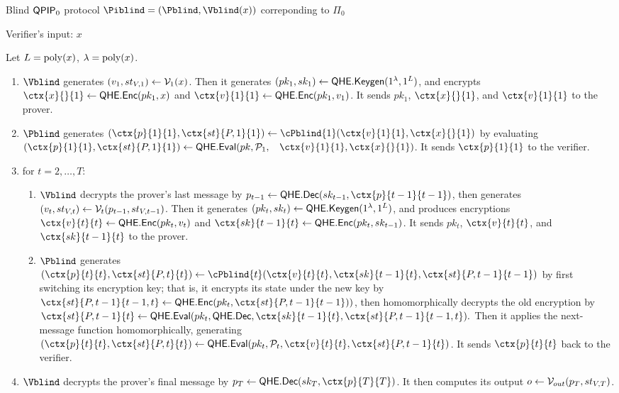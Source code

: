 \begin{protocol}{Blind $\operatorname{\mathsf{QPIP}}_0$ protocol $\Piblind=(\Pblind, \Vblind(x))$ correponding to $\Pi_0$}

	Verifier's input: $x$

	Let $L=\operatorname*{\operatorname{poly}}(x)$, $\lambda=\operatorname*{\operatorname{poly}}(x)$.

	\begin{enumerate}
		\item $\Vblind$ generates $(v_1, st_{V, 1})\leftarrow\mathcal{V}_1(x)$.
			Then it generates $(pk_1, sk_1)\leftarrow\mathsf{QHE.Keygen}(1^\lambda, 1^L)$,
			and encrypts $\ctx{x}{}{1}\leftarrow\QEnc(pk_1, x)$ and $\ctx{v}{1}{1}\leftarrow\QEnc(pk_1, v_1)$.
			It sends $pk_1$, $\ctx{x}{}{1}$, and $\ctx{v}{1}{1}$ to the prover.
		\item $\Pblind$ generates $(\ctx{p}{1}{1}, \ctx{st}{P, 1}{1})\leftarrow\cPblind{1}(\ctx{v}{1}{1}, \ctx{x}{}{1})$
			by evaluating %
			$(\ctx{p}{1}{1}, \ctx{st}{P, 1}{1})\leftarrow  \QEval(pk, \cP_1,$ \  $\ctx{v}{1}{1}, \ctx{x}{}{1})$.
			It sends $\ctx{p}{1}{1}$ to the verifier.
		\item for $t=2,\ldots,T$:
		\begin{enumerate}
			\item $\Vblind$ decrypts the prover's last message by $p_{t-1}\leftarrow\QDec(sk_{t-1}, \ctx{p}{t-1}{t-1})$,
				then generates $(v_t, st_{V, t})\leftarrow\mathcal{V}_t(p_{t-1}, st_{V, t-1})$.
				Then it generates $(pk_t, sk_t)\leftarrow\mathsf{QHE.Keygen}(1^\lambda, 1^L)$,
				and produces encryptions $\ctx{v}{t}{t}\leftarrow\QEnc(pk_t, v_t)$ and $\ctx{sk}{t-1}{t}\leftarrow\QEnc(pk_t, sk_{t-1})$.
				It sends $pk_t$, $\ctx{v}{t}{t}$, and $\ctx{sk}{t-1}{t}$ to the prover.
			\item $\Pblind$ generates $(\ctx{p}{t}{t}, \ctx{st}{P, t}{t})\leftarrow\cPblind{t}(\ctx{v}{t}{t}, \ctx{sk}{t-1}{t}, \ctx{st}{P, t-1}{t-1})$
				by first switching its encryption key;
				that is, it encrypts its state under the new key by $\ctx{st}{P, t-1}{t-1, t}\leftarrow\QEnc(pk_t, \ctx{st}{P, t-1}{t-1}))$,
				then homomorphically decrypts the old encryption by \linebreak
				$\ctx{st}{P, t-1}{t}\leftarrow\QEval(pk_t, \QDec, \ctx{sk}{t-1}{t}, \ctx{st}{P, t-1}{t-1, t}).$
				Then it applies the next-message function homomorphically, generating
				$(\ctx{p}{t}{t}, \ctx{st}{P, t}{t})\leftarrow\QEval(pk_t, \cP_t, \ctx{v}{t}{t}, \ctx{st}{P, t-1}{t})$.
				It sends $\ctx{p}{t}{t}$ back to the verifier.
		\end{enumerate}
		\item $\Vblind$ decrypts the prover's final message by $p_T\leftarrow\QDec(sk_T, \ctx{p}{T}{T})$.
			It then computes its output $o\leftarrow\mathcal{V}_{out}(p_T, st_{V, T})$.
	\end{enumerate}
\end{protocol}

